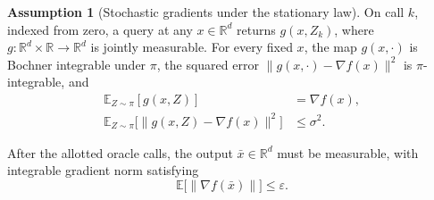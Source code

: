 \documentclass[10pt]{article}
\theoremstyle{definition}
\newtheorem{assumption}{Assumption}
\begin{document}
\begin{assumption}[Stochastic gradients under the stationary law]
On call $k$, indexed from zero, a query at any $x\in\mathbb{R}^d$ returns $g(x,Z_k)$, where $g:\mathbb{R}^d\times\mathbb{R}\to\mathbb{R}^d$ is jointly measurable. For every fixed $x$, the map $g(x,\cdot)$ is Bochner integrable under $\pi$, the squared error $\|g(x,\cdot)-\nabla f(x)\|^2$ is $\pi$-integrable, and
\[
\begin{aligned}
\mathbb{E}_{Z\sim\pi}[g(x,Z)] &= \nabla f(x),\\
\mathbb{E}_{Z\sim\pi}\bigl[\|g(x,Z)-\nabla f(x)\|^2\bigr] &\leq \sigma^2.
\end{aligned}
\]
\end{assumption}

After the allotted oracle calls, the output $\bar{x}\in\mathbb{R}^d$ must be measurable, with integrable gradient norm satisfying
\[
\mathbb{E}\bigl[\|\nabla f(\bar{x})\|\bigr]\leq\varepsilon.
\]
\end{document}
